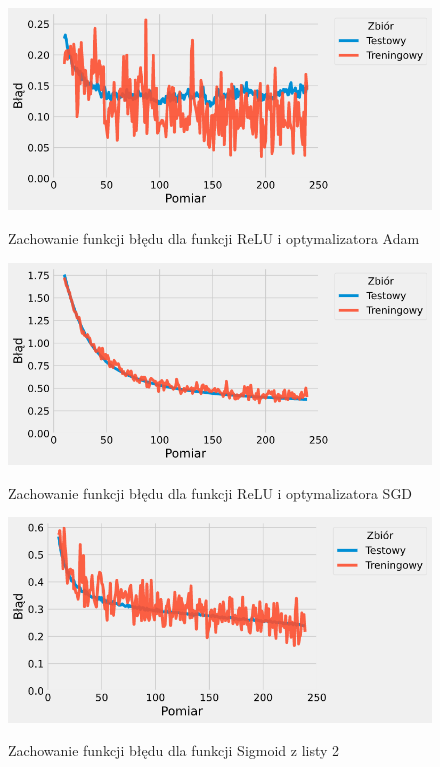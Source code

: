 \documentclass{article}
\begin{document}
\begin{figure}[H]
	\centering
	\caption{Zachowanie funkcji błędu dla funkcji ReLU i optymalizatora Adam}
	\includegraphics[width=\textwidth]{sig_adam_err.png}
	\label{fig:res116}
\end{figure}
\begin{figure}[H]
	\centering
	\caption{Zachowanie funkcji błędu dla funkcji ReLU i optymalizatora SGD}
	\includegraphics[width=\textwidth]{sig_sgd_err.png}
	\label{fig:res117}
\end{figure}
\begin{figure}[H]
	\centering
	\caption{Zachowanie funkcji błędu dla funkcji Sigmoid z listy 2}
	\includegraphics[width=\textwidth]{sig_2_err.png}
	\label{fig:res118}
\end{figure}
\end{document}
